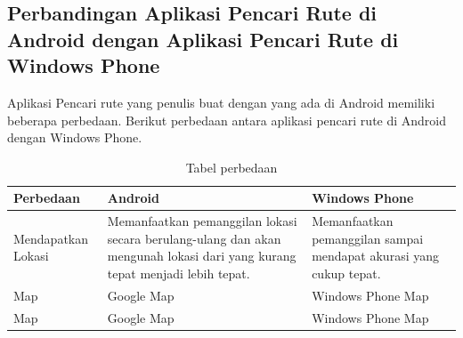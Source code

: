 \subsection{Perbandingan Aplikasi Pencari Rute di Android dengan Aplikasi Pencari Rute di Windows Phone}
\label{lab:Perbandingan}
\hspace{0.5cm} Aplikasi Pencari rute yang penulis buat dengan yang ada di Android memiliki beberapa perbedaan. Berikut perbedaan antara aplikasi pencari rute di Android dengan Windows Phone.

\begin{table}[h]
	\centering
		\begin{tabular}{|p{4cm}|p{4cm}|p{4cm}|}\hline
				Perbedaan & Android & Windows Phone \\ \hline
				Mendapatkan Lokasi & Memanfaatkan pemanggilan lokasi secara berulang-ulang dan akan mengunah lokasi dari yang kurang tepat menjadi lebih tepat. & Memanfaatkan pemanggilan sampai mendapat akurasi yang cukup tepat. \\ \hline
				Map  & Google Map & Windows Phone Map \\ \hline
				Map  & Google Map & Windows Phone Map \\ \hline
		\end{tabular}
	\caption{Tabel perbedaan}
	\label{tab:TabelPerbedaan}
\end{table}